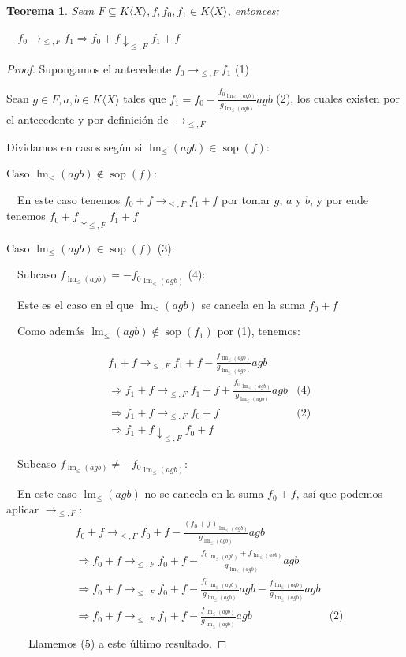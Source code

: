 \documentclass[fleqn]{amsbook} %
\theoremstyle{customstyle}
\newtheorem{theorem}{Teorema}[section]
\DeclareMathOperator{\sop}{sop}
\DeclareMathOperator{\lm}{lm}
\begin{document}
\begin{theorem}\label{thm:suma →↓}
Sean $F ⊆ K⟨X⟩, f, f_0, f_1 ∈ K⟨X⟩$, entonces:

  $f_0 →_{≤, F} f_1 ⇒ f_0 + f ↓_{≤, F} f_1 + f$

\end{theorem}
\begin{proof}
Supongamos el antecedente $f_0 →_{≤, F} f_1$ (1)

Sean $g ∈ F, a, b ∈ K⟨X⟩$ tales que $f_1 = f_0 - \frac{{f_0}_{\lm_≤(agb)}}{g_{\lm_≤(agb)}} agb$ (2), los cuales existen por el antecedente y por definición de $→_{≤, F}$

Dividamos en casos según si $\lm_≤(agb) ∈ \sop(f)$:

Caso $\lm_≤(agb) ∉ \sop(f)$:

  En este caso tenemos $f_0 + f →_{≤, F} f_1 + f$ por tomar $g$, $a$ y $b$, y por ende tenemos $f_0 + f ↓_{≤, F} f_1 + f$


Caso $\lm_≤(agb) ∈ \sop(f)$ (3):

  Subcaso $f_{\lm_≤(agb)} = -{f_0}_{\lm_≤(agb)}$ (4):

  Este es el caso en el que $\lm_≤(agb)$ se cancela en la suma $f_0 + f$

  Como además $\lm_≤(agb) ∉ \sop(f_1)$ por (1), tenemos:

\begin{align*}
&f_1 + f →_{≤, F} f_1 + f - \frac{f_{\lm_≤(agb)}}{g_{\lm_≤(agb)}} agb &\\
& ⇒ f_1 + f →_{≤, F} f_1 + f + \frac{{f_0}_{\lm_≤(agb)}}{g_{\lm_≤(agb)}} agb & \text{(4)} \\
& ⇒ f_1 + f →_{≤, F} f_0 + f & \text{(2)} \\
& ⇒ f_1 + f ↓_{≤, F} f_0 + f &
\end{align*}

  Subcaso $f_{\lm_≤(agb)} ≠ -{f_0}_{\lm_≤(agb)}$:

  En este caso $\lm_≤(agb)$ no se cancela en la suma $f_0 + f$, así que podemos aplicar $→_{≤, F}$:
\begin{align*}
&f_0 + f →_{≤, F} f_0 + f - \frac{(f_0 + f)_{\lm_≤(agb)}}{g_{\lm_≤(agb)}} agb &\\
& ⇒ f_0 + f →_{≤, F} f_0 + f - \frac{{f_0}_{\lm_≤(agb)} + f_{\lm_≤(agb)}}{g_{\lm_≤(agb)}} agb &\\
& ⇒ f_0 + f →_{≤, F} f_0 + f - \frac{{f_0}_{\lm_≤(agb)}}{g_{\lm_≤(agb)}} agb - \frac{f_{\lm_≤(agb)}}{g_{\lm_≤(agb)}} agb &\\
& ⇒ f_0 + f →_{≤, F} f_1 + f - \frac{f_{\lm_≤(agb)}}{g_{\lm_≤(agb)}} agb &\text{(2)}\\
\end{align*}
    Llamemos (5) a este último resultado.


\end{proof}
\end{document}
